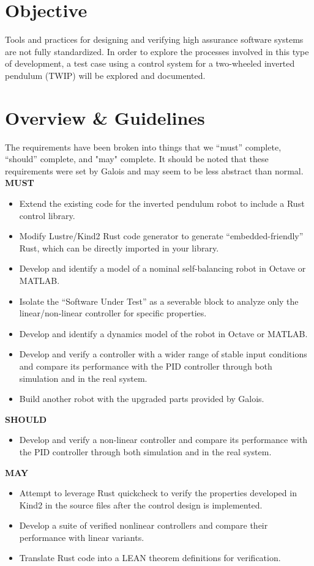 \documentclass[a4paper,12pt]{article}
\begin{document}
\section{Objective}
	Tools and practices for designing and verifying high assurance software systems are not fully standardized. In order to explore the processes involved in this type of development, a test case using a control system for a two-wheeled inverted pendulum (TWIP) will be explored and documented.
\section{Overview \& Guidelines}
The requirements have been broken into things that we “must” complete, “should” complete, and "may" complete. It should be noted that these requirements were set by Galois and may seem to be less abstract than normal.\\

\textbf{MUST}
\begin{itemize}
    \item Extend the existing code for the inverted pendulum robot to include a Rust control library.
    \item Modify Lustre/Kind2 Rust code generator to generate “embedded-friendly” Rust, which can be directly imported in your library.
    \item Develop and identify a model of a nominal self-balancing robot in Octave or MATLAB.
    \item Isolate the “Software Under Test” as a severable block to analyze only the linear/non-linear controller for specific properties.
    \item Develop and identify a dynamics model of the robot in Octave or MATLAB.
    \item Develop and verify a controller with a wider range of stable input conditions and compare its performance with the PID controller through both simulation and in the real system.
    \item Build another robot with the upgraded parts provided by Galois.
\end{itemize}
\textbf{SHOULD}
\begin{itemize}
    \item Develop and verify a non-linear controller and compare its performance with the PID controller through both simulation and in the real system.
\end{itemize}
\textbf{MAY}
\begin{itemize}
    \item Attempt to leverage Rust quickcheck to verify the properties developed in Kind2 in the source files after the control design is implemented.
    \item Develop a suite of verified nonlinear controllers and compare their performance with linear variants.
    \item Translate Rust code into a LEAN theorem definitions for verification.
\end{itemize}
\end{document}
